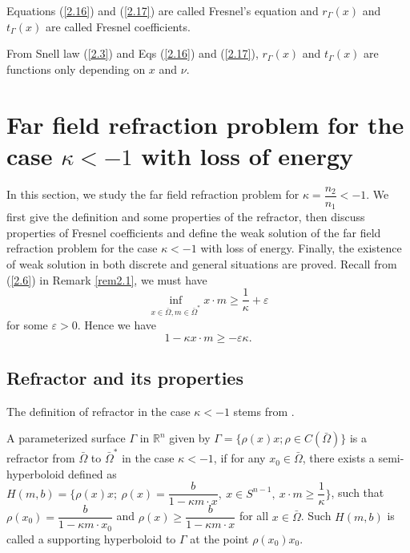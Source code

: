 \documentclass[a4paper,12pt,]{article}
\newtheorem{remark}{\hskip\parindent\bf Remark}[section]%
\newtheorem{definition}{\hskip\parindent\bf Definition}[section]%
\numberwithin{equation}{section}
\numberwithin{equation}{section} \allowdisplaybreaks
\begin{document}
\begin{remark}
  Equations (\ref{2.16}) and (\ref{2.17}) are called Fresnel's equation and $r_{\Gamma}(x)$ and $t_{\Gamma}(x)$ are called Fresnel coefficients.
  \label{rem2.2}
\end{remark}

\begin{remark}
    From Snell law (\ref{2.3}) and Eqs (\ref{2.16}) and (\ref{2.17}), $r_{\Gamma}(x)$ and $t_{\Gamma}(x)$ are functions only depending on $x$ and $\nu$.
    \label{rem2.3}
\end{remark}


\section{Far field refraction problem for the case $\kappa <-1$ with loss of energy}\label{Section 3}

\sloppy{}

In this section, we study the far field refraction problem for $\kappa = \dfrac{n_{2}}{n_{1}}<-1$. We first give the definition and some properties of the refractor, then discuss properties of Fresnel coefficients and define the weak solution of the far field refraction problem for the case $\kappa <-1$ with loss of energy. Finally, the existence of weak solution in both discrete and general situations are proved. Recall from (\ref{2.6}) in Remark \ref{rem2.1}, we must have
\begin{equation*}
  \inf_{x \in \bar{\Omega}, m \in \bar{\Omega}^{\ast}} x \cdot m \geq \frac{1}{\kappa} + \varepsilon
\end{equation*}
for some $\varepsilon>0$. Hence we have
\begin{equation}\label{3.1}
  1 - \kappa x \cdot m \geq -\varepsilon \kappa.
\end{equation}

\subsection{Refractor and its properties}\label{sec3.1}
The definition of refractor in the case $\kappa<-1$ stems from \cite{St17}.

\begin{definition}
  A parameterized surface $\Gamma$ in $\mathbb{R}^{n}$ given by $\Gamma = \{\rho(x)x; \rho \in C(\bar{\Omega})\}$ is a refractor from $\bar{\Omega}$ to $\bar{\Omega}^{\ast}$ in the case $\kappa<-1$, if for any $x_{0} \in \bar{\Omega}$, there exists a semi-hyperboloid defined as $H(m,b) = \{\rho(x)x; ~\rho(x) = \dfrac{b}{1 - \kappa m \cdot x}, ~x\in S^{n-1}, ~x \cdot m \geq \dfrac{1}{\kappa}\}$, such that $\rho(x_{0}) = \dfrac{b}{1 - \kappa m\cdot x_{0}}$ and $\rho(x) \geq \dfrac{b}{1 - \kappa m\cdot x}$ for all $x\in \bar{\Omega}$. Such $H(m,b)$ is called a supporting hyperboloid to $\Gamma$ at the point $\rho(x_{0})x_{0}$.
  \label{def3.1}
\end{definition}
\end{document}

